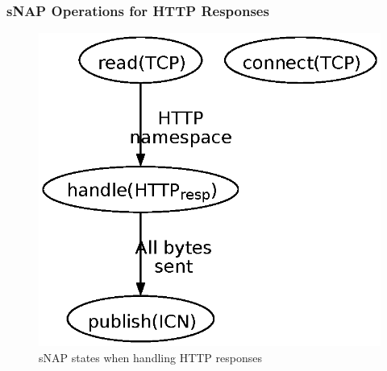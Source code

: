 \documentclass[a4paper,11pt,titlepage]{report}
\begin{document}
\subsubsection{\acl{sNAP} Operations for HTTP Responses}
\begin{figure}[!htb]
	\centering
	\includegraphics[width=1\linewidth]{eps/proxyStateMachine-HTTPresponses-sNAP}
	\caption{sNAP states when handling HTTP responses}
	\label{fig:Handling_HTTP_responses_sNAP}
\end{figure}
\end{document}

